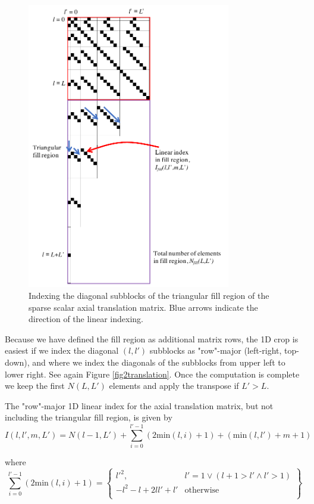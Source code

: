 \begin{figure}[H] 
   \centering
      \includegraphics[width=3.5in]{Translation/Figures/sparseindex_3} 
   \caption{Indexing the diagonal subblocks of the triangular fill region of the sparse scalar axial translation matrix. Blue arrows indicate the direction of the linear indexing. }
   \label{fig2translation2}
\end{figure}


Because we have defined the fill region as additional matrix rows, the 1D crop is easiest if we index the diagonal $(l,l')$ subblocks as "row"-major (left-right, top-down), and where we index the diagonals of the subblocks from upper left to lower right. See again Figure \ref{fig2translation}. Once the computation is complete we keep the first $N(L,L')$ elements and apply the transpose if $L' > L$.  

The "row"-major 1D linear index for the axial translation matrix, but not including the triangular fill region, is given by  
\begin{equation}
I(l,l',m,L') = N(l-1,L') + \sum_{i = 0}^{l'-1}  (2\textrm{min}(l,i) + 1)  + (\textrm{min}(l,l') + m + 1)   \label{eq:a3}
\end{equation}

\noindent where
\begin{equation}
\sum_{i = 0}^{l'-1}  (2\textrm{min}(l,i) + 1) = 
\left\{\begin{array}{cc} 
l'^2, & l' = 1 \lor ( l+1>l' \land l' > 1) \\
-l^2 - l + 2ll' + l' & \textrm{otherwise} \\
\end{array}
\right\}
\end{equation}  

